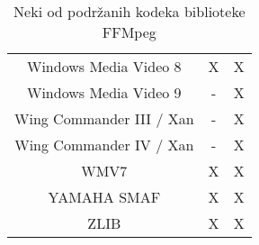 \begin{table}[h]
\begin{minipage}{\textwidth}
\begin{tabular}{|c|c|c|}
      Windows Media Video 8 & X & X \\
      Windows Media Video 9 & - & X \\
      Wing Commander III / Xan & - & X \\
      Wing Commander IV / Xan & - & X \\
      WMV7 & X & X \\
      YAMAHA SMAF & X & X \\
      ZLIB & X & X \\
      \hline
    \end{tabular}
    \caption[Neki od podržanih kodeka biblioteke FFMpeg]
    {\small Neki od podržanih kodeka biblioteke FFMpeg \cite{ffmpegBook}}
  \end{minipage}
\end{table}

  